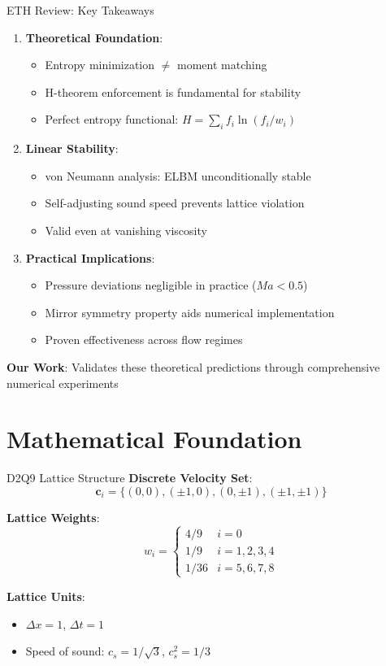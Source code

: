 \documentclass[aspectratio=169]{beamer}
\begin{document}
\begin{frame}{ETH Review: Key Takeaways}
\begin{enumerate}
    \item \textbf{Theoretical Foundation}:
    \begin{itemize}
        \item Entropy minimization $\neq$ moment matching
        \item H-theorem enforcement is fundamental for stability
        \item Perfect entropy functional: $H = \sum_i f_i \ln(f_i/w_i)$
    \end{itemize}

    \item \textbf{Linear Stability}:
    \begin{itemize}
        \item von Neumann analysis: ELBM unconditionally stable
        \item Self-adjusting sound speed prevents lattice violation
        \item Valid even at vanishing viscosity
    \end{itemize}

    \item \textbf{Practical Implications}:
    \begin{itemize}
        \item Pressure deviations negligible in practice ($Ma < 0.5$)
        \item Mirror symmetry property aids numerical implementation
        \item Proven effectiveness across flow regimes
    \end{itemize}
\end{enumerate}

\vspace{0.2cm}
\textbf{Our Work}: Validates these theoretical predictions through comprehensive numerical experiments
\end{frame}

\section{Mathematical Foundation}

\begin{frame}{D2Q9 Lattice Structure}
\textbf{Discrete Velocity Set}:
$$\mathbf{c}_i = \{(0,0), (\pm 1,0), (0,\pm 1), (\pm 1,\pm 1)\}$$

\textbf{Lattice Weights}:
$$w_i = \begin{cases}
4/9 & i=0 \\
1/9 & i=1,2,3,4 \\
1/36 & i=5,6,7,8
\end{cases}$$

\vspace{0.3cm}
\textbf{Lattice Units}:
\begin{itemize}
    \item $\Delta x = 1$, $\Delta t = 1$
    \item Speed of sound: $c_s = 1/\sqrt{3}$, $c_s^2 = 1/3$
\end{itemize}
\end{frame}
\end{document}

